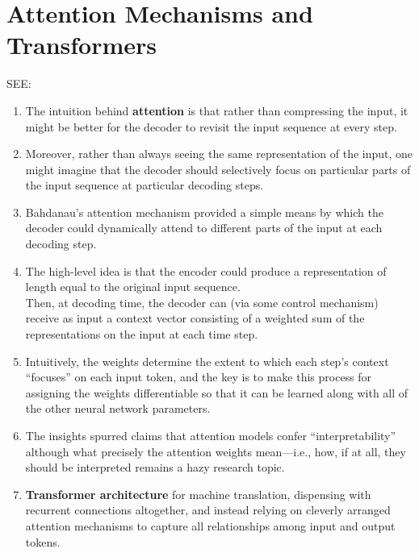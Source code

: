 \chapter{Attention Mechanisms and Transformers \cite{dnn-1}} \label{Attention Mechanisms and Transformers}

SEE: 

\begin{enumerate}
    \item The intuition behind \textbf{attention} is that rather than compressing the input, it might be better for the decoder to revisit the input sequence at every step. 
    
    \item Moreover, rather than always seeing the same representation of the input, one might imagine that the decoder should selectively focus on particular parts of the input sequence at particular decoding steps. 
    
    \item Bahdanau’s attention mechanism provided a simple means by which the decoder could dynamically attend to different parts of the input at each decoding step. 
    
    \item The high-level idea is that the encoder could produce a representation of length equal to the original input sequence. \\
    Then, at decoding time, the decoder can (via some control mechanism) receive as input a context vector consisting of a weighted sum of the representations on the input at each time step. 
    
    \item Intuitively, the weights determine the extent to which each step’s context “focuses” on each input token, and the key is to make this process for assigning the weights differentiable so that it can be learned along with all of the other neural network parameters.

    \item The insights spurred claims that attention models confer “interpretability” although what precisely the attention weights mean—i.e., how, if at all, they should be interpreted remains a hazy research topic.

    \item \textbf{Transformer architecture} for machine translation, dispensing with recurrent connections altogether, and instead relying on cleverly arranged attention mechanisms to capture all relationships among input and output tokens. 
    
\end{enumerate}


